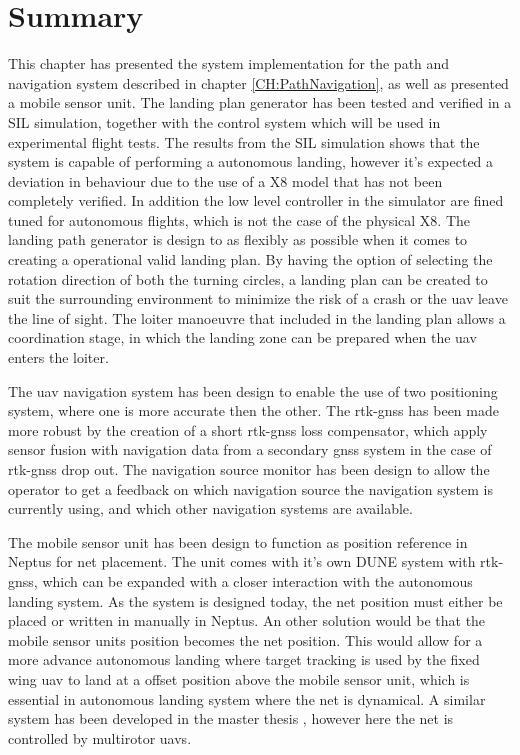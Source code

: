 \section{Summary}
This chapter has presented the system implementation for the path and navigation system described in chapter \ref{CH:PathNavigation}, as well as presented a mobile sensor unit. The landing plan generator has been tested and verified in a SIL simulation, together with the control system which will be used in experimental flight tests. The results from the SIL simulation shows that the system is capable of performing a autonomous landing, however it's expected a deviation in behaviour due to the use of a X8 model that has not been completely verified. In addition the low level controller in the simulator are fined tuned for autonomous flights, which is not the case of the physical X8. The landing path generator is design to as flexibly as possible when it comes to creating a operational valid landing plan. By having the option of selecting the rotation direction of both the turning circles, a landing plan can be created to suit the surrounding environment to minimize the risk of a crash or the \gls{uav} leave the line of sight. The loiter manoeuvre that included in the landing plan allows a coordination stage, in which the landing zone can be prepared when the \gls{uav} enters the loiter. 

The \gls{uav} navigation system has been design to enable the use of two positioning system, where one is more accurate then the other. The \gls{rtk-gnss} has been made more robust by the creation of a short \gls{rtk-gnss} loss compensator, which apply sensor fusion with navigation data from a secondary \gls{gnss} system in the case of \gls{rtk-gnss} drop out. The navigation source monitor has been design to allow the operator to get a feedback on which navigation source the navigation system is currently using, and which other navigation systems are available.

The mobile sensor unit has been design to function as position reference in Neptus for net placement. The unit comes with it's own DUNE system with \gls{rtk-gnss}, which can be expanded with a closer interaction with the autonomous landing system. As the system is designed today, the net position must either be placed or written in manually in Neptus. An other solution would be that the mobile sensor units position becomes the net position. This would allow for a more advance autonomous landing where target tracking is used by the fixed wing \gls{uav} to land at a offset position above the mobile sensor unit, which is essential in autonomous landing system where the net is dynamical. A similar system has been developed in the master thesis \citep{Jostein}, however here the net is controlled by multirotor \glspl{uav}.